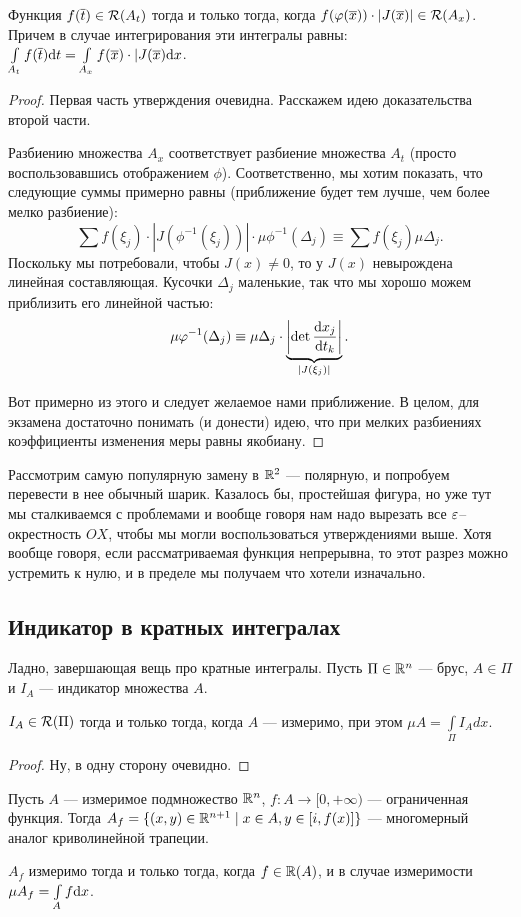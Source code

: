 \begin{Statement}
Функция $f(\overline t) \in \mathcal{R}(A_t)$ тогда и только тогда, когда $f(\varphi(\overline x)) \cdot|J(\overline x)| \in \mathcal{R}(A_x)$. Причем в случае интегрирования эти интегралы равны: $\int\limits_{A_t} f(\overline t) \mathrm{d} t = \int\limits_{A_x} f(\overline x) \cdot |J(\overline{x}) \mathrm{d} x$.
\end{Statement}
\begin{proof}
Первая часть утверждения очевидна. Расскажем идею доказательства второй части.

Разбиению множества $A_x$ соответствует разбиение множества $A_t$ (просто воспользовавшись отображением $\phi$). Соответственно, мы хотим показать, что следующие суммы примерно равны (приближение будет тем лучше, чем более мелко разбиение):
$$
\sum f(\xi_j) \cdot |J(\phi^{-1}(\xi_j))| \cdot \mu \phi^{-1}(\Delta_j) \equiv \sum f(\xi_j) \mu \Delta_j.
$$
Поскольку мы потребовали, чтобы $J(x) \neq 0$, то у $J(x)$ невырождена линейная составляющая. Кусочки $\Delta_j$ маленькие, так что мы хорошо можем приблизить его линейной частью:
$$
\mu \varphi^{-1}(\Delta_j) \equiv \mu \Delta_j \cdot \underbrace{\left| \det \dfrac{\mathrm{d} x_j}{\mathrm{d} t_k} \right|}_{|J(\xi_j)|}.
$$

Вот примерно из этого и следует желаемое нами приближение. В целом, для экзамена достаточно понимать (и донести) идею, что при мелких разбиениях коэффициенты изменения меры равны якобиану.
\end{proof}

Рассмотрим самую популярную замену в $\mathbb{R}^2$ --- полярную, и попробуем перевести в нее обычный шарик. Казалось бы, простейшая фигура, но уже тут мы сталкиваемся с проблемами и вообще говоря нам надо вырезать все $\varepsilon$--окрестность $OX$, чтобы мы могли воспользоваться утверждениями выше. Хотя вообще говоря, если рассматриваемая функция непрерывна, то этот разрез можно устремить к нулю, и в пределе мы получаем что хотели изначально.

\subsection{Индикатор в кратных интегралах}

Ладно, завершающая вещь про кратные интегралы. Пусть $\Pi \in \mathbb{R}^n$ --- брус, $A \in \Pi$ и $I_A$ --- индикатор множества $A$.

\begin{Statement}
$I_A \in \mathcal{R}(\Pi)$ тогда и только тогда, когда $A$ --- измеримо, при этом $\mu A = \int\limits_\Pi I_A dx$.
\end{Statement}
\begin{proof}
Ну, в одну сторону очевидно.
\end{proof}
Пусть $A$ --- измеримое подмножество $\mathbb{R}^n$, $f: A \to [0, +\infty)$ --- ограниченная функция. Тогда $A_f = \{ (x, y) \in \mathbb{R}^{n+1} \mid x\in  A, y \in [i, f(x)] \}$ --- многомерный аналог криволинейной трапеции.
\begin{Statement}
$A_f$ измеримо тогда и только тогда, когда $f\in \mathbb{R}(A)$, и в случае измеримости $\mu A_f = \int\limits_A f\mathrm{d}x$. 
\end{Statement}

